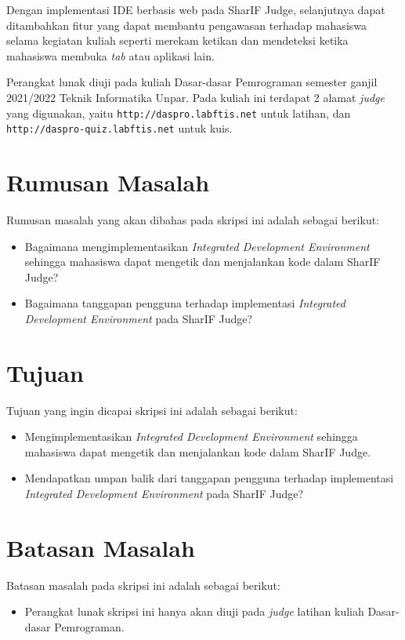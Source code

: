 Dengan implementasi IDE berbasis web pada SharIF Judge, selanjutnya dapat ditambahkan fitur yang dapat membantu pengawasan terhadap mahasiswa selama kegiatan kuliah seperti merekam ketikan dan mendeteksi ketika mahasiswa membuka \textit{tab} atau aplikasi lain.

Perangkat lunak diuji pada kuliah Dasar-dasar Pemrograman semester ganjil 2021/2022 \linebreak Teknik Informatika Unpar. Pada kuliah ini terdapat 2 alamat \textit{judge} yang digunakan, yaitu \linebreak \texttt{http://daspro.labftis.net} untuk latihan, dan \texttt{http://daspro-quiz.labftis.net} untuk kuis.

\section{Rumusan Masalah}
\label{sec:rumusan}
Rumusan masalah yang akan dibahas pada skripsi ini adalah sebagai berikut:
\begin{itemize}
	\item Bagaimana mengimplementasikan {\it Integrated Development Environment} sehingga mahasiswa dapat mengetik dan menjalankan kode dalam SharIF Judge?
	\item Bagaimana tanggapan pengguna terhadap implementasi {\it Integrated Development Environment} pada SharIF Judge? 
\end{itemize}


\section{Tujuan}
\label{sec:tujuan}
Tujuan yang ingin dicapai skripsi ini adalah sebagai berikut:
\begin{itemize}
	\item Mengimplementasikan {\it Integrated Development Environment} sehingga mahasiswa dapat mengetik dan menjalankan kode dalam SharIF Judge.
	\item Mendapatkan umpan balik dari tanggapan pengguna terhadap implementasi {\it Integrated Development Environment} pada SharIF Judge? 
\end{itemize}

\section{Batasan Masalah}
\label{sec:batasan}
Batasan masalah pada skripsi ini adalah sebagai berikut:
\begin{itemize}
    \item Perangkat lunak skripsi ini hanya akan diuji pada \textit{judge} latihan kuliah Dasar-dasar Pemrograman.
\end{itemize}

